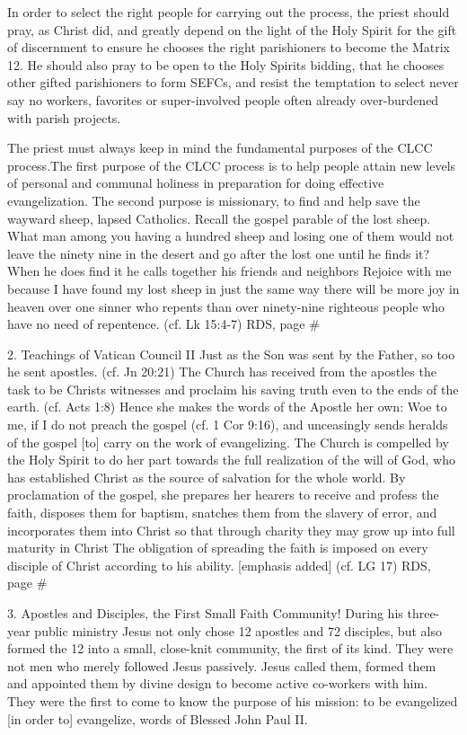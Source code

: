 \documentclass[oneside]{book}
\begin{document}
In order to select the right people for carrying out the process, the priest
should pray, as Christ did, and greatly depend on the light of the Holy Spirit
for the gift of discernment to ensure he chooses the right parishioners to
become the Matrix 12. He should also pray to be open to the Holy Spirits
bidding, that he chooses other gifted parishioners to form SEFCs, and resist the
temptation to select never say no workers, favorites or super-involved people
often already over-burdened with parish projects.

The priest must always keep in mind the fundamental purposes of the CLCC
process.The first purpose of the CLCC process is to help people attain new
levels of personal and communal holiness in preparation for doing effective
evangelization. The second purpose is missionary, to find and help save the
wayward sheep, lapsed Catholics. Recall the gospel parable of the lost
sheep. What man among you having a hundred sheep and losing one of them would
not leave the ninety nine in the desert and go after the lost one until he finds
it? When he does find it he calls together his friends and neighbors Rejoice
with me because I have found my lost sheep in just the same way there will be
more joy in heaven over one sinner who repents than over ninety-nine righteous
people who have no need of repentence. (cf. Lk 15:4-7) RDS, page \#

2. Teachings of Vatican Council II Just as the Son was sent by the Father, so
too he sent apostles. (cf. Jn 20:21) The Church has received from the apostles
the task to be Christs witnesses and proclaim his saving truth even to the ends
of the earth. (cf. Acts 1:8) Hence she makes the words of the Apostle her own:
Woe to me, if I do not preach the gospel (cf. 1 Cor 9:16), and unceasingly sends
heralds of the gospel [to] carry on the work of evangelizing. The Church is
compelled by the Holy Spirit to do her part towards the full realization of the
will of God, who has established Christ as the source of salvation for the whole
world. By proclamation of the gospel, she prepares her hearers to receive and
profess the faith, disposes them for baptism, snatches them from the slavery of
error, and incorporates them into Christ so that through charity they may grow
up into full maturity in Christ The obligation of spreading the faith is imposed
on every disciple of Christ according to his ability. [emphasis added] (cf. LG
17) RDS, page \#

3. Apostles and Disciples, the First Small Faith Community!  During his
three-year public ministry Jesus not only chose 12 apostles and 72 disciples,
but also formed the 12 into a small, close-knit community, the first of its
kind. They were not men who merely followed Jesus passively. Jesus called them,
formed them and appointed them by divine design to become active co-workers with
him. They were the first to come to know the purpose of his mission: to be
evangelized [in order to] evangelize, words of Blessed John Paul II.
\end{document}
